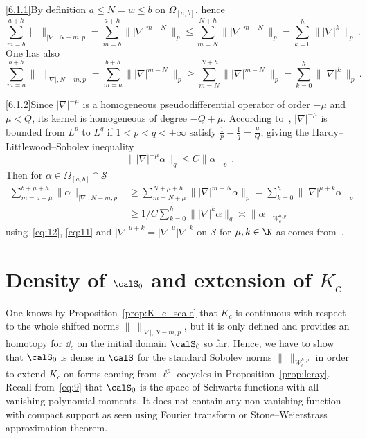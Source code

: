 \begin{proofc}
\eqref{6.1.1}\pointir By definition $a\leq N= w \leq b$ on $\Omega_{[a,b]}$, hence
\[
\sum_{m=b}^{a+h} \|\ \|_{|\nabla|, N-m, p} = \sum_{m=b}^{a+h}
\||\nabla|^{m-N}\ \|_p \leq \sum_{m=N}^{N+h}
\||\nabla|^{m-N} \ \|_p = \sum_{k=0}^h
\||\nabla|^k \ \|_p \,.
\]
One has also
\[
\sum_{m=a}^{b+h} \|\ \|_{|\nabla|, N-m, p} = \sum_{m=a}^{b+h}
\||\nabla|^{m-N}\ \|_p \geq \sum_{m=N}^{N+h}
\||\nabla|^{m-N} \ \|_p = \sum_{k=0}^h
\||\nabla|^k \ \|_p \,.
\]



\eqref{6.1.2}\pointir Since $|\nabla|^{-\mu}$ is a homogeneous pseudodifferential operator of order $-\mu$ and $\mu<Q$, its kernel is homogeneous of degree $-Q+\mu$. According to~\cite[Proposition~1.11]{Folland_1975}, $|\nabla|^{-\mu}$ is bounded from $L^{p}$ to $L^{q}$ if $1<p<q < +\infty$ satisfy $\frac{1}{p} - \frac{1}{q} = \frac{\mu}{Q}$, giving the Hardy--Littlewood--Sobolev inequality
\begin{equation}\label{eq:12}
\||\nabla|^{-\mu}\alpha\|_q \leq C \|\alpha \|_p \,.
\end{equation}
Then for $\alpha \in \Omega_{[a,b]}\cap \mathcal{S}$
\begin{align*}
\sum_{m=a+ \mu}^{b+\mu + h} \| \alpha \|_{|\nabla|, N-m,p} & \geq \sum_{m=N+\mu}^{N+\mu+ h} \||\nabla|^{m-N} \alpha \|_p = \sum_{k=0}^h \| |\nabla|^{\mu + k} \alpha\|_p\\
& \geq 1/C \sum_{k=0}^h \||\nabla|^k \alpha\|_q \asymp
\|\alpha\|_{W^{h,p}_c}
\end{align*}
using~\eqref{eq:12}, \eqref{eq:11} and $|\nabla|^{\mu + k} = |\nabla|^\mu |\nabla|^k $ on $\mathcal{S}$ for $\mu,k\in \N$ as comes from~\cite[Theorem~3.15]{Folland_1975}.
\end{proofc}


\section{Density of \texorpdfstring{$\calS_0$}{S0} and extension of \texorpdfstring{$K_c$}{Kc}}\label{sec:density-s_0}

One knows by Proposition~\ref{prop:K_c_scale} that $K_c$ is continuous with respect to the whole shifted norms $\|\ \|_{|\nabla|, N-m,p}$, but it is only defined and provides an homotopy for $\dd_c$ on the initial domain $\calS_0$ so far. Hence, we have to show that $\calS_0$ is dense in $\calS$ for the standard Sobolev norms $\|\ \|_{W^{h,p}_c}$ in order to extend $K_c$ on forms coming from $\ell^p$ cocycles in Proposition~\ref{prop:leray}. Recall from~\eqref{eq:9} that $\calS_0$ is the space of Schwartz functions with all vanishing polynomial moments. It does not contain any non vanishing function with compact support as seen using Fourier transform or Stone--Weierstrass approximation theorem.

